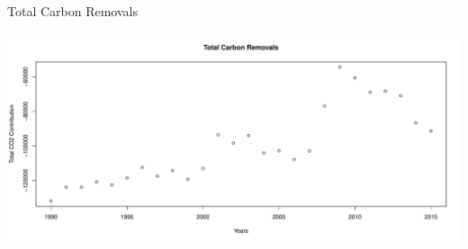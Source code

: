 \documentclass[final]{beamer}\usepackage[]{graphicx}\usepackage[]{color}
\makeatletter
\def\maxwidth{ %
  \ifdim\Gin@nat@width>\linewidth
    \linewidth
  \else
    \Gin@nat@width
  \fi
}
\newenvironment{knitrout}{}{} %
\newlength{\onecolwid}
\newlength{\twocolwid}
\makeatother
\begin{document}
\begin{frame}[t]
\begin{columns}[t]
\begin{column}{\twocolwid}
\begin{columns}[t,totalwidth=\twocolwid]
\begin{column}{\onecolwid}

\end{column} %

\end{columns} %


\begin{alertblock}{Total Carbon Removals}
\vspace{0ex}
\centering
\begin{knitrout}
\color{fgcolor}

{\centering \includegraphics[width=\maxwidth]{figure/RCODE-1} 

}



\end{knitrout}
\vfill
\end{alertblock} 


\begin{columns}[t,totalwidth=\twocolwid] %

\begin{column}{\onecolwid} %



\end{column}
\end{columns}
\end{column}
\end{columns}
\end{frame}
\end{document}

